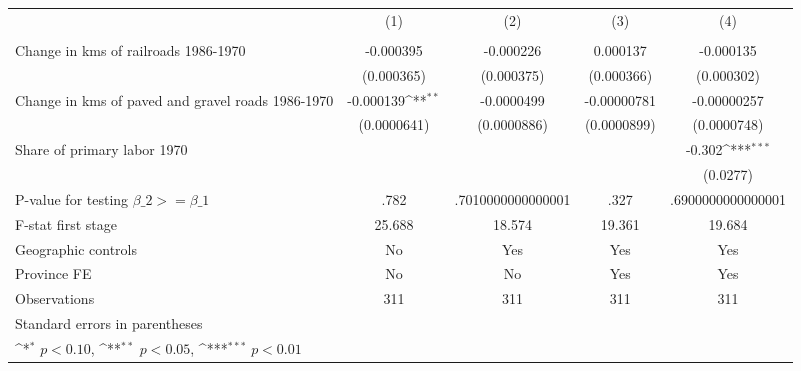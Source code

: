 {
\def\sym#1{\ifmmode^{#1}\else\(^{#1}\)\fi}
\begin{tabular}{l*{4}{c}}
\hline\hline
                &\multicolumn{1}{c}{(1)}&\multicolumn{1}{c}{(2)}&\multicolumn{1}{c}{(3)}&\multicolumn{1}{c}{(4)}\\
                &\multicolumn{1}{c}{}&\multicolumn{1}{c}{}&\multicolumn{1}{c}{}&\multicolumn{1}{c}{}\\
\hline
Change in kms of railroads 1986-1970&-0.000395         &-0.000226         & 0.000137         &-0.000135         \\
                &(0.000365)         &(0.000375)         &(0.000366)         &(0.000302)         \\
[1em]
Change in kms of paved and gravel roads 1986-1970&-0.000139\sym{**} &-0.0000499         &-0.00000781         &-0.00000257         \\
                &(0.0000641)         &(0.0000886)         &(0.0000899)         &(0.0000748)         \\
[1em]
Share of primary labor 1970&                  &                  &                  &   -0.302\sym{***}\\
                &                  &                  &                  & (0.0277)         \\
\hline
P-value for testing $\beta\_{2} >= \beta\_{1}$&     .782         &.7010000000000001         &     .327         &.6900000000000001         \\
F-stat first stage&   25.688         &   18.574         &   19.361         &   19.684         \\
Geographic controls&       No         &      Yes         &      Yes         &      Yes         \\
Province FE     &       No         &       No         &      Yes         &      Yes         \\
Observations    &      311         &      311         &      311         &      311         \\
\hline\hline
\multicolumn{5}{l}{\footnotesize Standard errors in parentheses}\\
\multicolumn{5}{l}{\footnotesize \sym{*} \(p<0.10\), \sym{**} \(p<0.05\), \sym{***} \(p<0.01\)}\\
\end{tabular}
}
